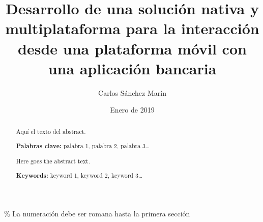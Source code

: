 \documentclass[a4paper, 12pt]{article}
\author{Carlos Sánchez Marín}
\date{Enero de 2019}
\title{Desarrollo de una solución nativa y multiplataforma para la interacción desde una plataforma móvil con una aplicación bancaria}
\begin{document}
\maketitle
\begin{export}
\null
\newpage

 \% La numeración debe ser romana hasta la primera sección
\tableofcontents
\newpage

\listoffigures
\listoftables
\newpage
\end{export}

\begin{abstract}
\normalsize
Aquí el texto del abstract.

\textbf{Palabras clave:} palabra 1, palabra 2, palabra 3\ldots{}
\end{abstract}

\begin{otherlanguage}{english}
\begin{abstract}
\normalsize
Here goes the abstract text.

\textbf{Keywords:} keyword 1, keyword 2, keyword 3\ldots
\end{abstract}
\end{otherlanguage}

\newpage
{}%
\end{document}
